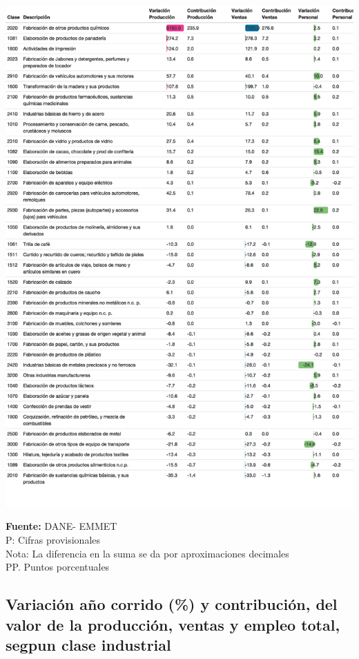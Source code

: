 \documentclass[
]{article}
\begin{document}
\includegraphics{boletin_files/figure-latex/tabla1_view-1.png}

\textbf{Fuente:} DANE- EMMET\\
P: Cifras provisionales\\
Nota: La diferencia en la suma se da por aproximaciones decimales\\
PP. Puntos porcentuales

\hypertarget{variaciuxf3n-auxf1o-corrido-y-contribuciuxf3n-del-valor-de-la-producciuxf3n-ventas-y-empleo-total-segpun-clase-industrial}{%
\subsection{Variación año corrido (\%) y contribución, del valor de la
producción, ventas y empleo total, segpun clase
industrial}\label{variaciuxf3n-auxf1o-corrido-y-contribuciuxf3n-del-valor-de-la-producciuxf3n-ventas-y-empleo-total-segpun-clase-industrial}}
\end{document}
